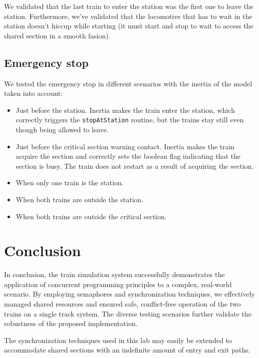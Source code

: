 \documentclass{article}
\begin{document}
    We validated that the last train to enter the station was the first one to leave the station. Furthermore, we've validated that the locomotive that has to wait in the station doesn't hiccup while starting (it must start and stop to wait to access the shared section in a smooth fasion).

    \subsection*{Emergency stop}

    We tested the emergency stop in different scenarios with the inertia of the model taken into account:
    \begin{itemize}
        \item Just before the station. Inertia makes the train enter the station, which correctly triggers the \texttt{stopAtStation} routine, but the trains stay still even though being allowed to leave.
        \item Just before the critical section warning contact. Inertia makes the train acquire the section and correctly sets the boolean flag indicating that the section is busy. The train does not restart as a result of acquiring the section.
        \item When only one train is the station.
        \item When both trains are outside the station.
        \item When both trains are outside the critical section.
    \end{itemize}


    \section{Conclusion}

    In conclusion, the train simulation system successfully demonstrates the application of concurrent programming principles to a complex, real-world scenario. By employing semaphores and synchronization techniques, we effectively managed shared resources and ensured safe, conflict-free operation of the two trains on a single track system. The diverse testing scenarios further validate the robustness of the proposed implementation.

    The synchronization techniques used in this lab may easily be extended to accommodate shared sections with an indefinite amount of entry and exit paths.

    \appendix
\end{document}

